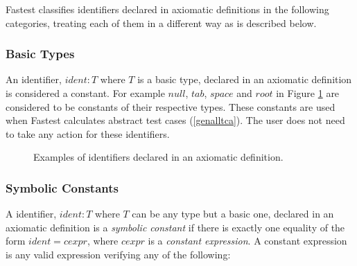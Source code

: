 Fastest classifies identifiers declared in axiomatic definitions in the following categories, treating each of them in a different way as is described below.

\subsubsection{Basic Types}
An identifier, $ident:T$ where $T$ is a basic type, declared in an axiomatic definition is considered a constant. For example $null$, $tab$, $space$ and $root$ in Figure \ref{f:axdef} are considered to be constants of their respective types. These constants are used when Fastest calculates abstract test cases (\ref{genalltca}). The user does not need to take any action for these identifiers.

\begin{figure}
\begin{zed}
\end{zed}


\caption{\label{f:axdef}Examples of identifiers declared in an axiomatic definition.}
\end{figure}


\subsubsection{Symbolic Constants}
A identifier, $ident:T$ where $T$ can be any type but a basic one, declared in an axiomatic definition is a {\it symbolic constant} if there is exactly one equality of the form $ident = cexpr$, where $cexpr$ is a {\it constant expression}. A constant expression is any valid expression verifying any of the following:

